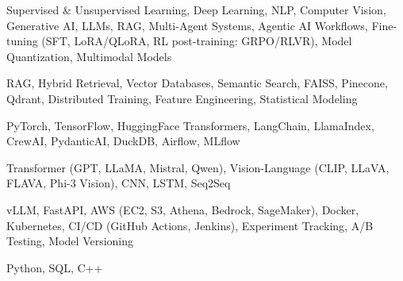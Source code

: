 \documentclass[letter,10pt]{article}
\begin{document}
 Supervised \& Unsupervised Learning, Deep Learning, NLP, Computer Vision, Generative AI, LLMs, RAG, Multi-Agent Systems, Agentic AI Workflows, Fine-tuning (SFT, LoRA/QLoRA, RL post-training: GRPO/RLVR), Model Quantization, Multimodal Models\par\vspace{2pt}

 RAG, Hybrid Retrieval, Vector Databases, Semantic Search, FAISS, Pinecone, Qdrant, Distributed Training, Feature Engineering, Statistical Modeling\par\vspace{2pt}

 PyTorch, TensorFlow, HuggingFace Transformers, LangChain, LlamaIndex, CrewAI, PydanticAI, DuckDB, Airflow, MLflow\par\vspace{2pt}

 Transformer (GPT, LLaMA, Mistral, Qwen), Vision-Language (CLIP, LLaVA, FLAVA, Phi-3 Vision), CNN, LSTM, Seq2Seq\par\vspace{2pt}

 vLLM, FastAPI, AWS (EC2, S3, Athena, Bedrock, SageMaker), Docker, Kubernetes, CI/CD (GitHub Actions, Jenkins), Experiment Tracking, A/B Testing, Model Versioning\par\vspace{2pt}

 Python, SQL, C++
\end{document}
